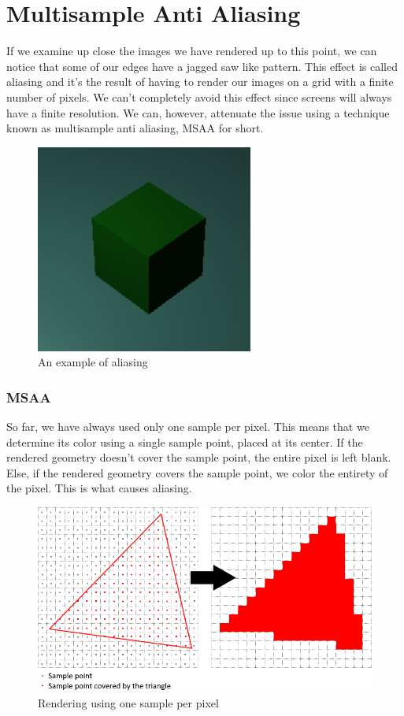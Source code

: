 \chapter{Multisample Anti Aliasing}

If we examine up close the images we have rendered up to this point, we
can notice that some of our edges have a jagged saw like pattern.
This effect is called aliasing and it's the result of having to render our
images on a grid with a finite number of pixels.
We can't completely avoid this effect since screens will always have a
finite resolution.
We can, however, attenuate the issue using a technique known as multisample
anti aliasing, MSAA for short.

\begin{figure}[H]
    \centering
    \includegraphics[scale=1.0]{images/ChMSAA/AnExampleOfAliasing.png}
    \caption{An example of aliasing}
    \label{fig::AliasingExample}
\end{figure}

\subsection{MSAA}

So far, we have always used only one sample per pixel.
This means that we determine its color using a single sample
point, placed at its center.
If the rendered geometry doesn't cover the sample point, the entire pixel
is left blank.
Else, if the rendered geometry covers the sample point, we color the entirety of
the pixel.
This is what causes aliasing.

\begin{figure}[H]
    \centering
    \includegraphics[scale=0.6]{images/ChMSAA/OneSamplePerPixel.png}
    \caption{Rendering using one sample per pixel}
    \label{fig::OneSamplePerPixel}
\end{figure}

